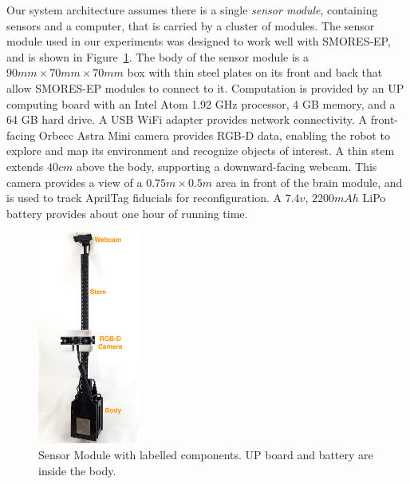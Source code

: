 \documentclass[conference]{IEEEtran}
\begin{document}
\label{sec:sensor_module}
%
Our system architecture assumes there is a single \textit{sensor module}, containing sensors and a computer, that is carried by a cluster of modules.
The sensor module used in our experiments was designed to work well with SMORES-EP, and is shown in Figure~\ref{fig:sensor-module}.
The body of the sensor module is a \(90mm \times 70mm \times 70mm\) box with thin steel plates on its front and back that allow SMORES-EP modules
to connect to it.
Computation is provided by an UP computing board with an Intel Atom 1.92 GHz
processor, 4 GB memory, and a 64 GB hard drive. A USB WiFi adapter provides
network connectivity. A front-facing Orbecc Astra Mini camera provides RGB-D
data, enabling the robot to explore and map its environment and recognize
objects of interest.  A thin stem extends $40cm$ above the body, supporting a
downward-facing webcam. This camera provides a view of a  $0.75m\times0.5m$ area
in front of the brain module, and is used to track AprilTag
\cite{olson2011apriltag} fiducials for reconfiguration. A $7.4v$, $2200mAh$ LiPo
battery provides about one hour of running time.

%
\begin{figure}
\begin{center}
\includegraphics[width=0.3\textwidth]{images/sensor_module_new_labelled.jpg}
\caption{Sensor Module with labelled components.  UP board and battery are inside the body.}
\label{fig:sensor-module}
\end{center}
\vspace{-2em}
\end{figure}
%
\end{document}

